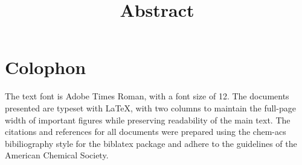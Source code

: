 \documentclass[a4paper,12pt]{article}
\date{}
\title{Abstract} %
\begin{document}
	\section*{Colophon}
	
	\vspace{1.5\baselineskip} %
	
	
	The text font is Adobe Times Roman, with a font size of 12. The documents presented are typeset with \LaTeX, with two columns to maintain the full-page width of important figures while preserving readability of the main text. The citations and references for all documents were prepared using the \textsf{chem-acs} bibiliography style for the \textsf{biblatex} package and adhere to the guidelines of the American Chemical Society. 
	 
	 
	
\end{document}
